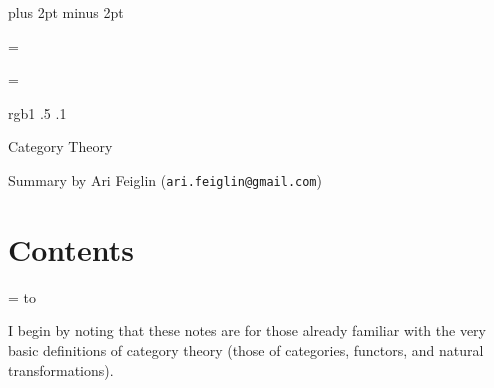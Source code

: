 




\parindent=0pt
\parskip=3pt plus 2pt minus 2pt



\footline={}


\headline={}

\color rgb{1 .5 .1}

{\def\boxshadowcolor{rgb{1 .7 .7}}

    \centerline{Category Theory}
    \smallskip
    \centerline{Summary by Ari Feiglin ({\tt ari.feiglin@gmail.com})}

\eppbox

\bigskip

    \section*{Contents}
    
    \tableofcontents
\eppbox

}

\vfill\break

\color{black}

\newif\ifpageodd
\pageoddtrue
\headline={%
    \hbox to \hsize{\color{black}%
        \ifpageodd\hfil{\it\currsubsection\quad\bf\folio}\global\pageoddfalse%
        \else{\bf\folio\quad\it\currsubsection}\hfil\global\pageoddtrue\fi%
    }%
}

I begin by noting that these notes are for those already familiar with the very basic definitions of category theory (those of categories, functors, and natural transformations).







\bye

